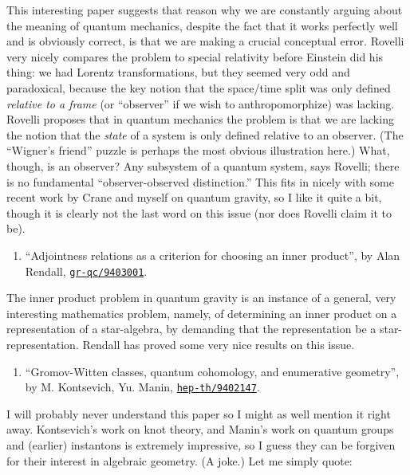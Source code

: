 \documentclass{article}
\def\tightlist{}
\begin{document}
This interesting paper suggests that reason why we are constantly
arguing about the meaning of quantum mechanics, despite the fact that it
works perfectly well and is obviously correct, is that we are making a
crucial conceptual error. Rovelli very nicely compares the problem to
special relativity before Einstein did his thing: we had Lorentz
transformations, but they seemed very odd and paradoxical, because the
key notion that the space/time split was only defined \emph{relative to
a frame} (or ``observer'' if we wish to anthropomorphize) was lacking.
Rovelli proposes that in quantum mechanics the problem is that we are
lacking the notion that the \emph{state} of a system is only defined
relative to an observer. (The ``Wigner's friend'' puzzle is perhaps the
most obvious illustration here.) What, though, is an observer? Any
subsystem of a quantum system, says Rovelli; there is no fundamental
``observer-observed distinction.'' This fits in nicely with some recent
work by Crane and myself on quantum gravity, so I like it quite a bit,
though it is clearly not the last word on this issue (nor does Rovelli
claim it to be).

\begin{enumerate}
\def\labelenumi{\arabic{enumi})}
\setcounter{enumi}{1}
\tightlist
\item
  ``Adjointness relations as a criterion for choosing an inner
  product'', by Alan Rendall,
  \href{http://xxx.lanl.gov/abs/gr-qc/9403001}{\texttt{gr-qc/9403001}}.
\end{enumerate}

The inner product problem in quantum gravity is an instance of a
general, very interesting mathematics problem, namely, of determining an
inner product on a representation of a star-algebra, by demanding that
the representation be a star-representation. Rendall has proved some
very nice results on this issue.

\begin{enumerate}
\def\labelenumi{\arabic{enumi})}
\setcounter{enumi}{2}
\tightlist
\item
  ``Gromov-Witten classes, quantum cohomology, and enumerative
  geometry'', by M. Kontsevich, Yu. Manin,
  \href{http://xxx.lanl.gov/abs/hep-th/9402147}{\texttt{hep-th/9402147}}.
\end{enumerate}

I will probably never understand this paper so I might as well mention
it right away. Kontsevich's work on knot theory, and Manin's work on
quantum groups and (earlier) instantons is extremely impressive, so I
guess they can be forgiven for their interest in algebraic geometry. (A
joke.) Let me simply quote:
\end{document}
